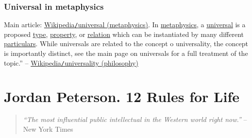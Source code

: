 \documentclass{article}
\begin{document}
\subsubsection{Universal in metaphysics}
Main article: \href{https://en.wikipedia.org/wiki/Universal_(metaphysics)}{Wikipedia{\tt/}universal (metaphysics)}. In \href{https://en.wikipedia.org/wiki/Metaphysics}{metaphysics}, a \href{https://en.wikipedia.org/wiki/Universal_(metaphysics)}{universal} is a proposed \href{https://en.wikipedia.org/wiki/Type_(metaphysics)}{type}, \href{https://en.wikipedia.org/wiki/Property_(metaphysics)}{property}, or \href{https://en.wikipedia.org/wiki/Relation_(metaphysics)}{relation} which can be instantiated by many different \href{https://en.wikipedia.org/wiki/Particular}{particulars}. While universals are related to the concept o universality, the concept is importantly distinct, see the main page on universals for a full treatment of the topic.'' -- \href{https://en.wikipedia.org/wiki/Universality_(philosophy)}{Wikipedia{\tt/}universality (philosophy)}


\section{Jordan Peterson. 12 Rules for Life}

\begin{quotation}
	\textit{``The most influential public intellectual in the Western world right now.''} -- New York Times
\end{quotation}
\end{document}
